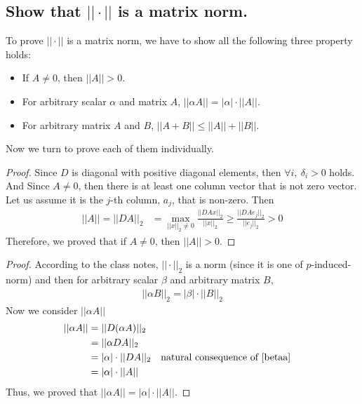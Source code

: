 \documentclass[11pt,a4paper]{article}
\begin{document}
\newpage
\subsection{Show that $|| \cdot ||$ is a matrix norm.}
To prove $||\cdot||$ is a matrix norm, we have to show all the following three
property holds: 
\begin{itemize}
    \item If $A \not = 0$, then $|| A || > 0$.
    \item For arbitrary scalar $\alpha$ and matrix $A$, $||\alpha A|| = | \alpha | \cdot || A || $.
    \item For arbitrary matrix $A$ and $B$, $|| A+B || \leq || A || + || B ||$.
\end{itemize}
Now we turn to prove each of them individually.
\begin{proof}
    Since $D$ is diagonal with positive diagonal elements, then $\forall i,\
    \delta_i > 0$ holds. And Since $A \not = 0$, then there is at least one
    column vector that is not zero vector. Let us assume it is the $j$-th
    column, $a_j$, that is non-zero. Then
    \begin{align}
        || A || = || DA ||_2 
        &= \max_{||x||_2 \not=0} \frac{||DAx||_2}{||x||_2}
        \geq \frac{||DAe_j||_2}{|| e_j ||_2} > 0
    \end{align}
    Therefore, we proved that if $A \not = 0$, then $|| A || > 0$.
\end{proof}
\begin{proof}
    According to the class notes, $||\cdot||_2$ is a norm (since it is one of
    $p$-induced-norm) and then for arbitrary scalar $\beta$ and arbitrary matrix $B$,
    \begin{align}
        || \alpha B ||_2 = | \beta | \cdot || B ||_2  \label{betaa}
    \end{align}
    Now we consider $|| \alpha A||$
    \begin{align}
        || \alpha A ||  
        &= || D (\alpha A) ||_2 \\
        &= ||\alpha  D A ||_2 \\
        &= |\alpha| \cdot || D A ||_2 && \text{natural consequence of \eqref{betaa}} \\
        &= |\alpha| \cdot || A ||
    \end{align}
    Thus, we proved that $|| \alpha A || = |\alpha| \cdot || A ||$.
\end{proof}
\end{document}
